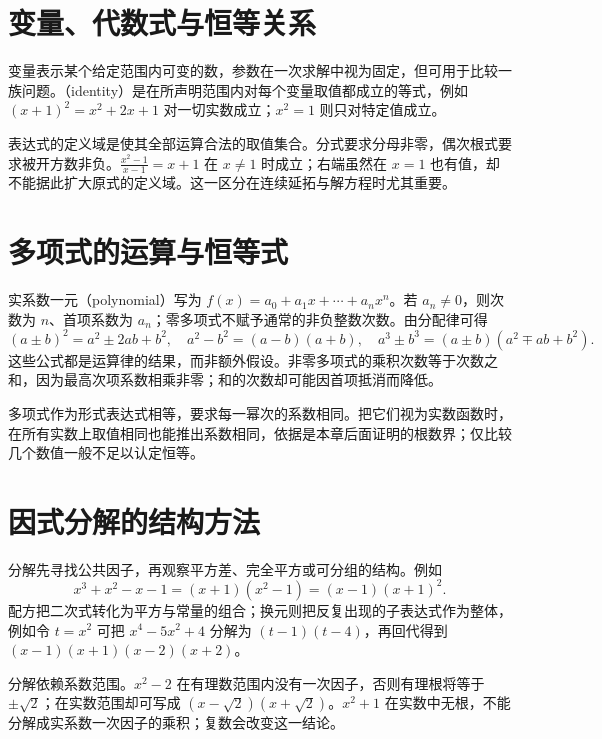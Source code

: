 \documentclass[UTF8]{ctexbook}
\begin{document}
\section{变量、代数式与恒等关系}
变量表示某个给定范围内可变的数，参数在一次求解中视为固定，但可用于比较一族问题。（identity）是在所声明范围内对每个变量取值都成立的等式，例如 $(x+1)^2=x^2+2x+1$ 对一切实数成立；$x^2=1$ 则只对特定值成立。

表达式的定义域是使其全部运算合法的取值集合。分式要求分母非零，偶次根式要求被开方数非负。$\frac{x^2-1}{x-1}=x+1$ 在 $x\ne1$ 时成立；右端虽然在 $x=1$ 也有值，却不能据此扩大原式的定义域。这一区分在连续延拓与解方程时尤其重要。

\section{多项式的运算与恒等式}
实系数一元（polynomial）写为 $f(x)=a_0+a_1x+\cdots+a_nx^n$。若 $a_n\ne0$，则次数为 $n$、首项系数为 $a_n$；零多项式不赋予通常的非负整数次数。由分配律可得
\[
 (a\pm b)^2=a^2\pm2ab+b^2,\quad
 a^2-b^2=(a-b)(a+b),\quad
 a^3\pm b^3=(a\pm b)(a^2\mp ab+b^2).
\]
这些公式都是运算律的结果，而非额外假设。非零多项式的乘积次数等于次数之和，因为最高次项系数相乘非零；和的次数却可能因首项抵消而降低。

多项式作为形式表达式相等，要求每一幂次的系数相同。把它们视为实数函数时，在所有实数上取值相同也能推出系数相同，依据是本章后面证明的根数界；仅比较几个数值一般不足以认定恒等。

\section{因式分解的结构方法}
分解先寻找公共因子，再观察平方差、完全平方或可分组的结构。例如
\[
 x^3+x^2-x-1=(x+1)(x^2-1)=(x-1)(x+1)^2.
\]
配方把二次式转化为平方与常量的组合；换元则把反复出现的子表达式作为整体，例如令 $t=x^2$ 可把 $x^4-5x^2+4$ 分解为 $(t-1)(t-4)$，再回代得到 $(x-1)(x+1)(x-2)(x+2)$。

分解依赖系数范围。$x^2-2$ 在有理数范围内没有一次因子，否则有理根将等于 $\pm\sqrt2$；在实数范围却可写成 $(x-\sqrt2)(x+\sqrt2)$。$x^2+1$ 在实数中无根，不能分解成实系数一次因子的乘积；复数会改变这一结论。
\end{document}
